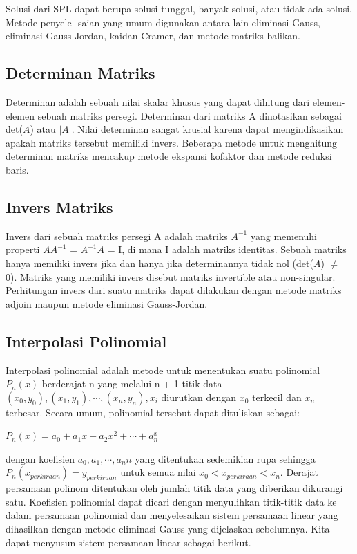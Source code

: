 \documentclass{article}
\begin{document}
Solusi dari SPL dapat berupa solusi tunggal, banyak solusi, atau tidak ada solusi. Metode penyele-
saian yang umum digunakan antara lain eliminasi Gauss, eliminasi Gauss-Jordan, kaidan Cramer, dan
metode matriks balikan.
\subsection{Determinan Matriks}

Determinan adalah sebuah nilai skalar khusus yang dapat dihitung dari elemen-elemen sebuah matriks
persegi. Determinan dari matriks A dinotasikan sebagai det($A$) atau $|A|$. Nilai determinan sangat
krusial karena dapat mengindikasikan apakah matriks tersebut memiliki invers. Beberapa metode untuk
menghitung determinan matriks mencakup metode ekspansi kofaktor dan metode reduksi baris.

\subsection{Invers Matriks}

Invers dari sebuah matriks persegi A adalah matriks $A^{-1}$ yang memenuhi properti $AA^{-1}$ = $A^{-1}A$ =
I, di mana I adalah matriks identitas. Sebuah matriks hanya memiliki invers jika dan hanya jika
determinannya tidak nol (det($A$) $\neq$ 0). Matriks yang memiliki invers disebut matriks invertible atau
non-singular. Perhitungan invers dari suatu matriks dapat dilakukan dengan metode matriks adjoin
maupun metode eliminasi Gauss-Jordan.

\subsection{Interpolasi Polinomial}

Interpolasi polinomial adalah metode untuk menentukan suatu polinomial $P_{n}(x)$ berderajat n yang
melalui n + 1 titik data $(x_0, y_0),(x_1, y_1),\cdots,(x_n, y_n), x_i$ diurutkan dengan $x_0$ terkecil dan $x_n$ terbesar.
Secara umum, polinomial tersebut dapat dituliskan sebagai:

\begin{center}
$P_{n}(x) = a_{0} + a_{1}x + a_{2}x^{2} +\cdots+ a_{n}^{x}$
\end{center}

dengan koefisien $a_{0}, a_{1},\cdots, a_n{n}$ yang ditentukan sedemikian rupa sehingga $P_{n}(x_{perkiraan}) = y_{perkiraan}$
untuk semua nilai $x_{0} < x_{perkiraan} < x_{n}$. Derajat persamaan polinom ditentukan oleh jumlah titik data
yang diberikan dikurangi satu.
Koefisien polinomial dapat dicari dengan menyulihkan titik-titik data ke dalam persamaan polinomial dan menyelesaikan sistem persamaan linear yang dihasilkan dengan metode eliminasi Gauss yang
dijelaskan sebelumnya. Kita dapat menyusun sistem persamaan linear sebagai berikut.
\end{document}
